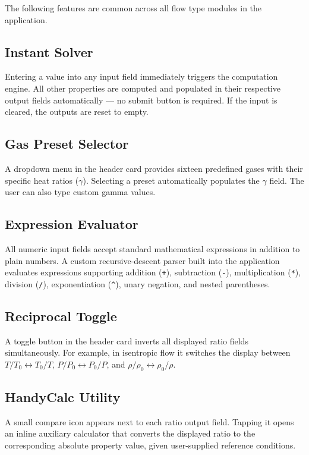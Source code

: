The following features are common across all flow type modules in the application.

\subsection*{Instant Solver}
Entering a value into any input field immediately triggers the computation engine. All other properties are computed and populated in their respective output fields automatically — no submit button is required. If the input is cleared, the outputs are reset to empty.

\subsection*{Gas Preset Selector}
A dropdown menu in the header card provides sixteen predefined gases with their specific heat ratios ($\gamma$). Selecting a preset automatically populates the $\gamma$ field. The user can also type custom gamma values.

\subsection*{Expression Evaluator}
All numeric input fields accept standard mathematical expressions in addition to plain numbers. A custom recursive-descent parser built into the application evaluates expressions supporting addition (\texttt{+}), subtraction (\texttt{-}), multiplication (\texttt{*}), division (\texttt{/}), exponentiation (\texttt{\^}), unary negation, and nested parentheses.

\subsection*{Reciprocal Toggle}
A toggle button in the header card inverts all displayed ratio fields simultaneously. For example, in isentropic flow it switches the display between $T/T_0 \leftrightarrow T_0/T$, $P/P_0 \leftrightarrow P_0/P$, and $\rho/\rho_0 \leftrightarrow \rho_0/\rho$.

\subsection*{HandyCalc Utility}
A small compare icon appears next to each ratio output field. Tapping it opens an inline auxiliary calculator that converts the displayed ratio to the corresponding absolute property value, given user-supplied reference conditions.

